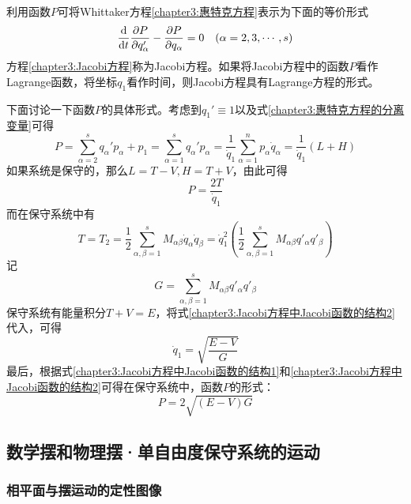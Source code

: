 利用函数$P$可将Whittaker方程\eqref{chapter3:惠特克方程}表示为下面的等价形式
\begin{equation}
	\frac{\mathrm{d}}{\mathrm{d} t}\frac{\partial P}{\partial q_\alpha'} - \frac{\partial P}{\partial q_\alpha} = 0\quad (\alpha=2,3,\cdots,s)
	\label{chapter3:Jacobi方程}
\end{equation}
方程\eqref{chapter3:Jacobi方程}称为Jacobi方程。如果将Jacobi方程中的函数$P$看作Lagrange函数，将坐标$q_1$看作时间，则Jacobi方程具有Lagrange方程的形式。

下面讨论一下函数$P$的具体形式。考虑到$q_1'\equiv 1$以及式\eqref{chapter3:惠特克方程的分离变量}可得
\begin{equation}
	P = \sum_{\alpha=2}^sq_\alpha'p_\alpha+p_1 = \sum_{\alpha=1}^s q_\alpha'p_\alpha = \frac{1}{\dot{q}_1} \sum_{\alpha=1}^n p_\alpha\dot{q}_\alpha = \frac{1}{\dot{q}_1}(L+H)
\end{equation}
如果系统是保守的，那么$L=T-V, H=T+V$，由此可得
\begin{equation}
	P = \frac{2T}{\dot{q}_1}
	\label{chapter3:Jacobi方程中Jacobi函数的结构1}
\end{equation}
而在保守系统中有
\begin{equation}
	T = T_2 = \frac12 \sum_{\alpha,\beta=1}^s M_{\alpha\beta}\dot{q}_\alpha\dot{q}_\beta = \dot{q}_1^2 \left(\frac12 \sum_{\alpha,\beta=1}^s M_{\alpha\beta}q'_\alpha q'_\beta\right)
	\label{chapter3:Jacobi方程中Jacobi函数的结构2}
\end{equation}
记
\begin{equation}
	G = \sum_{\alpha,\beta=1}^s M_{\alpha\beta}q'_\alpha q'_\beta
\end{equation}
保守系统有能量积分$T+V=E$，将式\eqref{chapter3:Jacobi方程中Jacobi函数的结构2}代入，可得
\begin{equation*}
	\dot{q}_1 = \sqrt{\frac{E-V}{G}}
\end{equation*}
最后，根据式\eqref{chapter3:Jacobi方程中Jacobi函数的结构1}和\eqref{chapter3:Jacobi方程中Jacobi函数的结构2}可得在保守系统中，函数$P$的形式：
\begin{equation}
	P = 2\sqrt{(E-V)G}
\end{equation}

\subsection{数学摆和物理摆·单自由度保守系统的运动}

\subsubsection{相平面与摆运动的定性图像}

